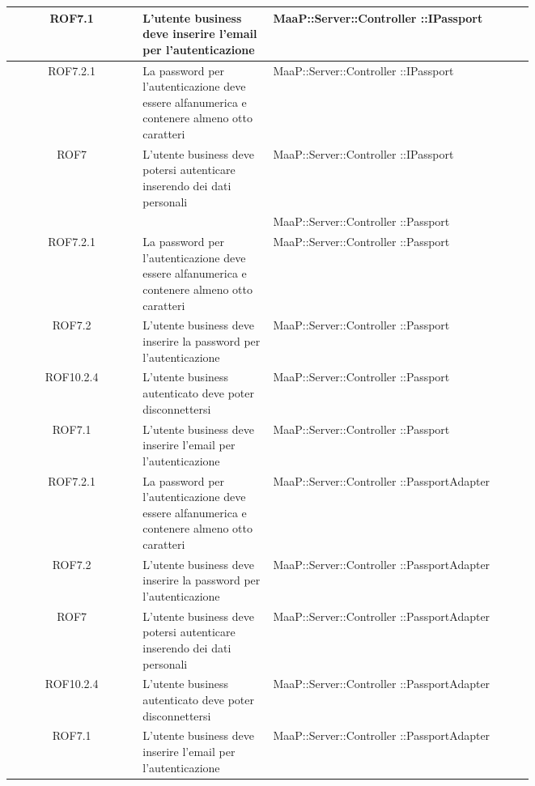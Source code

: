 \begin{center}
\begin{longtable}{|c|p{0.25\linewidth}|p{0.5\linewidth}|}
\midrule
ROF7.1
& L'utente business deve inserire l'email per l'autenticazione
& MaaP::Server::Controller ::IPassport\\

\midrule
ROF7.2.1
& La password per l'autenticazione deve essere alfanumerica e contenere almeno otto caratteri
& MaaP::Server::Controller ::IPassport\\

\midrule
ROF7
& L'utente business deve potersi autenticare inserendo dei dati personali
& MaaP::Server::Controller ::IPassport\\
& & MaaP::Server::Controller ::Passport\\

\midrule
ROF7.2.1
& La password per l'autenticazione deve essere alfanumerica e contenere almeno otto caratteri
& MaaP::Server::Controller ::Passport\\

\midrule
ROF7.2
& L'utente business deve inserire la password per l'autenticazione
& MaaP::Server::Controller ::Passport\\

\midrule
ROF10.2.4
& L'utente business autenticato deve poter disconnettersi
& MaaP::Server::Controller ::Passport\\

\midrule
ROF7.1
& L'utente business deve inserire l'email per l'autenticazione
& MaaP::Server::Controller ::Passport\\

\midrule
ROF7.2.1
& La password per l'autenticazione deve essere alfanumerica e contenere almeno otto caratteri
& MaaP::Server::Controller ::PassportAdapter\\

\midrule
ROF7.2
& L'utente business deve inserire la password per l'autenticazione
& MaaP::Server::Controller ::PassportAdapter\\

\midrule
ROF7
& L'utente business deve potersi autenticare inserendo dei dati personali
& MaaP::Server::Controller ::PassportAdapter\\

\midrule
ROF10.2.4
& L'utente business autenticato deve poter disconnettersi
& MaaP::Server::Controller ::PassportAdapter\\

\midrule
ROF7.1
& L'utente business deve inserire l'email per l'autenticazione
& MaaP::Server::Controller ::PassportAdapter\\


\end{longtable}
\end{center}
